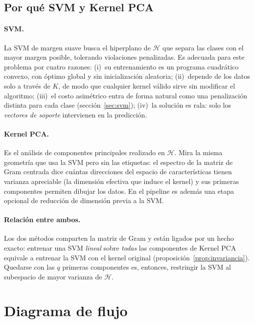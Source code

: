\documentclass[11pt,a4paper]{article}
\newcommand{\Hk}{\mathcal{H}}
\theoremstyle{plain}
\theoremstyle{definition}
\theoremstyle{remark}
\numberwithin{equation}{section}
\begin{document}
\subsection{Por qué SVM y Kernel PCA}

\paragraph{SVM.} La SVM de margen suave busca el hiperplano de $\Hk$ que separa las clases
con el mayor margen posible, tolerando violaciones penalizadas. Es adecuada para este problema
por cuatro razones: (i)~su entrenamiento es un programa cuadrático convexo, con óptimo global
y sin inicialización aleatoria; (ii)~depende de los datos solo a través de $K$, de modo que
cualquier kernel válido sirve sin modificar el algoritmo; (iii)~el costo asimétrico entra de
forma natural como una penalización distinta para cada clase (sección~\ref{sec:svm});
(iv)~la solución es rala: solo los \emph{vectores de soporte} intervienen en la predicción.

\paragraph{Kernel PCA.} Es el análisis de componentes principales realizado en $\Hk$. Mira
la misma geometría que usa la SVM pero sin las etiquetas: el espectro de la matriz de Gram
centrada dice cuántas direcciones del espacio de características tienen varianza apreciable
(la dimensión efectiva que induce el kernel) y sus primeras componentes permiten dibujar los
datos. En el pipeline es además una etapa opcional de reducción de dimensión previa a la SVM.

\paragraph{Relación entre ambos.} Los dos métodos comparten la matriz de Gram y están ligados
por un hecho exacto: entrenar una SVM \emph{lineal} sobre \emph{todas} las componentes de
Kernel PCA equivale a entrenar la SVM con el kernel original
(proposición~\ref{prop:invariancia}). Quedarse con las $q$ primeras componentes es, entonces,
restringir la SVM al subespacio de mayor varianza de $\Hk$.

\section{Diagrama de flujo}
\end{document}
